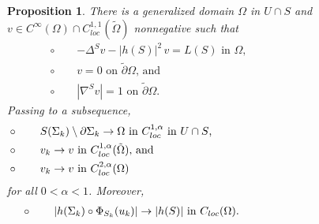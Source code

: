 \documentclass[11pt]{amsart}
\newtheorem{prop}{Proposition}
\begin{document}
\begin{prop} \label{convergence}
There is a generalized domain $\Omega$ in $U\cap S$ and  $ v\in C^\infty(\Omega)\cap C_{loc}^{1,1}(\tilde \Omega)$
nonnegative such that 
\begin{align}
		&\circ \qquad \text{$-\Delta^S v-|h(S)|^2\,v=L(S)$ in $\Omega$,} \label{PDE}\\
	&\circ\qquad \text{$v=0$ on $\tilde \partial \Omega$, and} \label{v}\hspace{8cm}\\
	&\circ \qquad \text{$|\nabla ^S v|=1$  on $\tilde \partial  \Omega$.} \label{grad v}
\end{align}
 Passing to a subsequence,
 \begin{align}
 	&\circ \qquad \text{$S(\Sigma_k)\setminus \partial \Sigma_k\to \Omega$ in $C_{loc}^{1,\alpha}$ in $U\cap S$,} \hspace{6.1cm} \label{generalized domain convergence} \\
 	&\circ \qquad \text{$v_k\to v$  in $C_{loc}^{1,\alpha }(\tilde \Omega),$  and} \label{v convergence} \\
 	&\circ \qquad \text{$v_k\to v$ in $C^{2,\alpha}_{loc}(\Omega)$} \label{v convergence 1} 
 \end{align}
for all $0<\alpha<1$. Moreover,
 \begin{align}
&\circ\qquad  	\text{$|h(\Sigma_k)\circ \Phi_{S_k}(u_k)|\to|h(S)|$ in $C_{loc}(\Omega)$.   }\label{second fundamental form convergence} \hspace{4.3cm}
 \end{align}
 
\end{prop}
\end{document}
